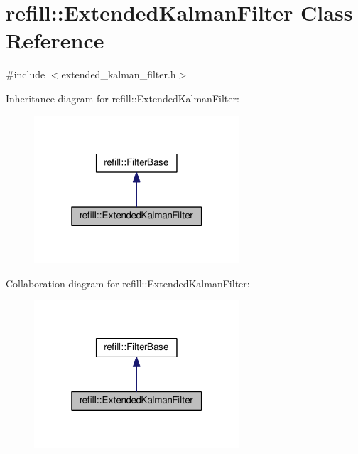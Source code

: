 \hypertarget{classrefill_1_1ExtendedKalmanFilter}{}\section{refill\+:\+:Extended\+Kalman\+Filter Class Reference}
\label{classrefill_1_1ExtendedKalmanFilter}


{\ttfamily \#include $<$extended\+\_\+kalman\+\_\+filter.\+h$>$}



Inheritance diagram for refill\+:\+:Extended\+Kalman\+Filter\+:\nopagebreak
\begin{figure}[H]
\begin{center}
\leavevmode
\includegraphics[width=217pt]{classrefill_1_1ExtendedKalmanFilter__inherit__graph}
\end{center}
\end{figure}


Collaboration diagram for refill\+:\+:Extended\+Kalman\+Filter\+:\nopagebreak
\begin{figure}[H]
\begin{center}
\leavevmode
\includegraphics[width=217pt]{classrefill_1_1ExtendedKalmanFilter__coll__graph}
\end{center}
\end{figure}
